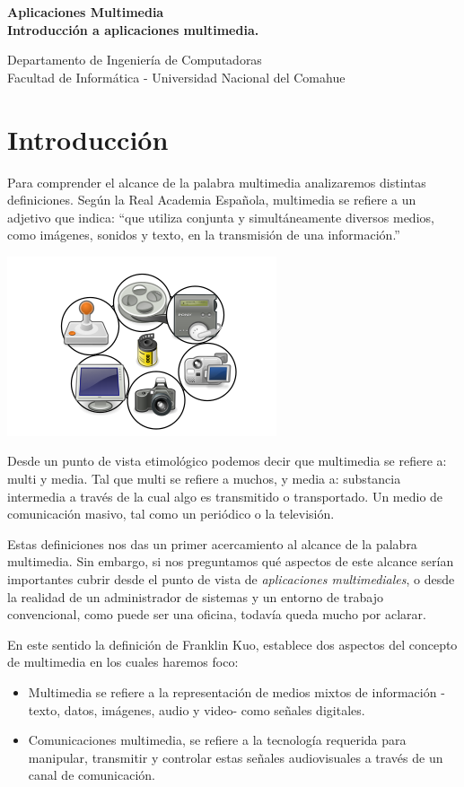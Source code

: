 \documentclass[12pt]{article}
\def\maketitle{

 \makeatletter
 {\color{bl} \centering \huge \sc \textbf{
  Aplicaciones Multimedia\\ 
\large \vspace*{-8pt} \color{black}Introducción a aplicaciones multimedia. 
 \vspace*{8pt} }\par}
 \makeatother

\makeatletter
 {\centering \small 
 	Departamento de Ingeniería de Computadoras \\
 	Facultad de Informática - Universidad Nacional del Comahue \\
 	\vspace{20pt} }
 \makeatother

}
\begin{document}
\thispagestyle{empty}
\maketitle
\setlength{\parindent}{0pt}

\section*{Introducción}


Para comprender el alcance de la palabra multimedia analizaremos distintas 
definiciones. Según la Real Academia Española, multimedia se refiere a un 
adjetivo que indica: ``que utiliza conjunta y simultáneamente diversos 
medios, como imágenes, sonidos y texto, en la transmisión de una 
información.''\cite{raemm}

\begin{center}
\includegraphics{multimedia.png}
\end{center}

Desde un punto de vista etimológico podemos decir que multimedia se 
refiere a: multi y media. Tal que multi se refiere a  muchos, y media a: 
substancia intermedia a través de la cual algo es transmitido o 
transportado. Un medio de comunicación masivo, tal como un periódico o 
la televisión.\cite{ramyer}

Estas definiciones nos das un primer acercamiento al alcance de la palabra
multimedia. Sin embargo, si nos preguntamos qué aspectos de este alcance 
serían importantes cubrir desde el punto de vista de {\it aplicaciones 
multimediales}, o desde la realidad de un administrador de sistemas y un 
entorno de trabajo convencional, como puede ser una oficina, todavía queda
mucho por aclarar. 

En este sentido la definición de Franklin Kuo, establece dos aspectos del
concepto de multimedia en los cuales haremos foco:

\begin{itemize}
\item Multimedia se refiere a la representación de medios mixtos de información
-texto, datos, imágenes, audio y video- como señales digitales. 
\item Comunicaciones multimedia, se refiere a la tecnología requerida para 
manipular, transmitir y controlar estas señales audiovisuales a través de un 
canal de comunicación.\cite{frankuo}
\end{itemize}
\end{document}
